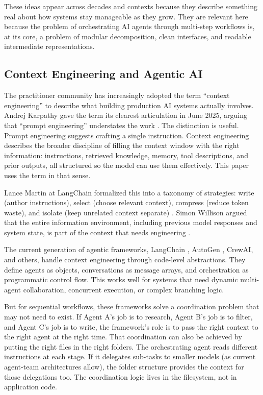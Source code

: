 \documentclass[acmlarge,nonacm,screen]{acmart}
\begin{document}
These ideas appear across decades and contexts because they describe something real about how systems stay manageable as they grow. They are relevant here because the problem of orchestrating AI agents through multi-step workflows is, at its core, a problem of modular decomposition, clean interfaces, and readable intermediate representations.

\subsection{Context Engineering and Agentic AI}

The practitioner community has increasingly adopted the term ``context engineering'' to describe what building production AI systems actually involves. Andrej Karpathy gave the term its clearest articulation in June 2025, arguing that ``prompt engineering'' understates the work \cite{karpathy2025}. The distinction is useful. Prompt engineering suggests crafting a single instruction. Context engineering describes the broader discipline of filling the context window with the right information: instructions, retrieved knowledge, memory, tool descriptions, and prior outputs, all structured so the model can use them effectively. This paper uses the term in that sense.

Lance Martin at LangChain formalized this into a taxonomy of strategies: write (author instructions), select (choose relevant context), compress (reduce token waste), and isolate (keep unrelated context separate) \cite{martin2025}. Simon Willison argued that the entire information environment, including previous model responses and system state, is part of the context that needs engineering \cite{willison2025}.

The current generation of agentic frameworks, LangChain \cite{chase2022}, AutoGen \cite{wu2023autogen}, CrewAI, and others, handle context engineering through code-level abstractions. They define agents as objects, conversations as message arrays, and orchestration as programmatic control flow. This works well for systems that need dynamic multi-agent collaboration, concurrent execution, or complex branching logic.

But for sequential workflows, these frameworks solve a coordination problem that may not need to exist. If Agent A's job is to research, Agent B's job is to filter, and Agent C's job is to write, the framework's role is to pass the right context to the right agent at the right time. That coordination can also be achieved by putting the right files in the right folders. The orchestrating agent reads different instructions at each stage. If it delegates sub-tasks to smaller models (as current agent-team architectures allow), the folder structure provides the context for those delegations too. The coordination logic lives in the filesystem, not in application code.
\end{document}
